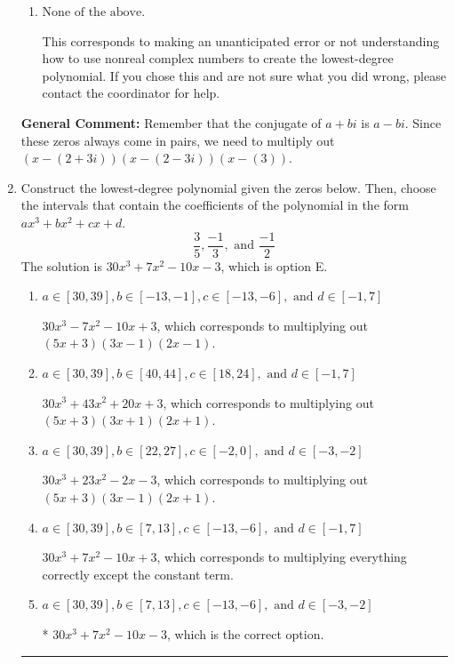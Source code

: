 \documentclass{extbook}[14pt]
\newcommand{\litem}[1]{\item #1

\rule{\textwidth}{0.4pt}}
\begin{document}
\begin{enumerate}
{\begin{enumerate}[label=\Alph*.]
* $x^{3} -7 x^{2} +25 x -39$, which is the correct option.
\item \( \text{None of the above.} \)

This corresponds to making an unanticipated error or not understanding how to use nonreal complex numbers to create the lowest-degree polynomial. If you chose this and are not sure what you did wrong, please contact the coordinator for help.
\end{enumerate}

\textbf{General Comment:} Remember that the conjugate of $a+bi$ is $a-bi$. Since these zeros always come in pairs, we need to multiply out $(x-(2 + 3 i))(x-(2 - 3 i))(x-(3))$.
}
\litem{
Construct the lowest-degree polynomial given the zeros below. Then, choose the intervals that contain the coefficients of the polynomial in the form $ax^3+bx^2+cx+d$.
\[ \frac{3}{5}, \frac{-1}{3}, \text{ and } \frac{-1}{2} \]The solution is \( 30x^{3} +7 x^{2} -10 x -3 \), which is option E.\begin{enumerate}[label=\Alph*.]
\item \( a \in [30, 39], b \in [-13, -1], c \in [-13, -6], \text{ and } d \in [-1, 7] \)

$30x^{3} -7 x^{2} -10 x + 3$, which corresponds to multiplying out $(5x + 3)(3x -1)(2x -1)$.
\item \( a \in [30, 39], b \in [40, 44], c \in [18, 24], \text{ and } d \in [-1, 7] \)

$30x^{3} +43 x^{2} +20 x + 3$, which corresponds to multiplying out $(5x + 3)(3x + 1)(2x + 1)$.
\item \( a \in [30, 39], b \in [22, 27], c \in [-2, 0], \text{ and } d \in [-3, -2] \)

$30x^{3} +23 x^{2} -2 x -3$, which corresponds to multiplying out $(5x + 3)(3x -1)(2x + 1)$.
\item \( a \in [30, 39], b \in [7, 13], c \in [-13, -6], \text{ and } d \in [-1, 7] \)

$30x^{3} +7 x^{2} -10 x + 3$, which corresponds to multiplying everything correctly except the constant term.
\item \( a \in [30, 39], b \in [7, 13], c \in [-13, -6], \text{ and } d \in [-3, -2] \)

* $30x^{3} +7 x^{2} -10 x -3$, which is the correct option.
\end{enumerate}

}
\end{enumerate}
\end{document}
